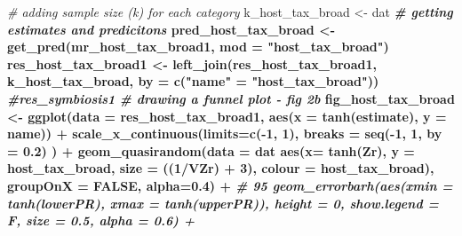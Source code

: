 \documentclass[
]{article}
\newenvironment{Shaded}{\begin{snugshade}}{\end{snugshade}}
\newcommand{\CommentTok}[1]{\textcolor[rgb]{0.56,0.35,0.01}{\textit{#1}}}
\newcommand{\DataTypeTok}[1]{\textcolor[rgb]{0.13,0.29,0.53}{#1}}
\newcommand{\DecValTok}[1]{\textcolor[rgb]{0.00,0.00,0.81}{#1}}
\newcommand{\FloatTok}[1]{\textcolor[rgb]{0.00,0.00,0.81}{#1}}
\newcommand{\KeywordTok}[1]{\textcolor[rgb]{0.13,0.29,0.53}{\textbf{#1}}}
\newcommand{\NormalTok}[1]{#1}
\newcommand{\OperatorTok}[1]{\textcolor[rgb]{0.81,0.36,0.00}{\textbf{#1}}}
\newcommand{\OtherTok}[1]{\textcolor[rgb]{0.56,0.35,0.01}{#1}}
\newcommand{\StringTok}[1]{\textcolor[rgb]{0.31,0.60,0.02}{#1}}
\begin{document}
\begin{Shaded}
\begin{Highlighting}[]
\CommentTok{# adding sample size (k) for each category}
\NormalTok{k_host_tax_broad <-}\StringTok{ }\NormalTok{dat }\OperatorTok{%
\CommentTok{# getting estimates and predicitons}
\NormalTok{pred_host_tax_broad <-}\StringTok{ }\KeywordTok{get_pred}\NormalTok{(mr_host_tax_broad1, }\DataTypeTok{mod =} \StringTok{"host_tax_broad"}\NormalTok{) }
\NormalTok{res_host_tax_broad1 <-}\StringTok{ }\KeywordTok{left_join}\NormalTok{(res_host_tax_broad1, k_host_tax_broad, }\DataTypeTok{by =}  \KeywordTok{c}\NormalTok{(}\StringTok{"name"}\NormalTok{ =}\StringTok{ "host_tax_broad"}\NormalTok{))  }\OperatorTok{%
\CommentTok{#res_symbiosis1 }
\CommentTok{# drawing a funnel plot - fig 2b}
\NormalTok{fig_host_tax_broad <-}\StringTok{ }\KeywordTok{ggplot}\NormalTok{(}\DataTypeTok{data =}\NormalTok{ res_host_tax_broad1, }\KeywordTok{aes}\NormalTok{(}\DataTypeTok{x =} \KeywordTok{tanh}\NormalTok{(estimate), }\DataTypeTok{y =}\NormalTok{ name)) }\OperatorTok{+}
\StringTok{  }\KeywordTok{scale_x_continuous}\NormalTok{(}\DataTypeTok{limits=}\KeywordTok{c}\NormalTok{(}\OperatorTok{-}\DecValTok{1}\NormalTok{, }\DecValTok{1}\NormalTok{), }\DataTypeTok{breaks =} \KeywordTok{seq}\NormalTok{(}\OperatorTok{-}\DecValTok{1}\NormalTok{, }\DecValTok{1}\NormalTok{, }\DataTypeTok{by =} \FloatTok{0.2}\NormalTok{) ) }\OperatorTok{+}
\StringTok{  }\KeywordTok{geom_quasirandom}\NormalTok{(}\DataTypeTok{data =}\NormalTok{ dat }\OperatorTok{%
                   \KeywordTok{aes}\NormalTok{(}\DataTypeTok{x=} \KeywordTok{tanh}\NormalTok{(Zr), }\DataTypeTok{y =}\NormalTok{ host_tax_broad, }\DataTypeTok{size =}\NormalTok{ ((}\DecValTok{1}\OperatorTok{/}\NormalTok{VZr) }\OperatorTok{+}\StringTok{ }\DecValTok{3}\NormalTok{), }\DataTypeTok{colour =}\NormalTok{ host_tax_broad), }\DataTypeTok{groupOnX =} \OtherTok{FALSE}\NormalTok{, }\DataTypeTok{alpha=}\FloatTok{0.4}\NormalTok{) }\OperatorTok{+}\StringTok{ }
\StringTok{  }\CommentTok{# 95 %
\StringTok{  }\KeywordTok{geom_errorbarh}\NormalTok{(}\KeywordTok{aes}\NormalTok{(}\DataTypeTok{xmin =} \KeywordTok{tanh}\NormalTok{(lowerPR), }\DataTypeTok{xmax =} \KeywordTok{tanh}\NormalTok{(upperPR)),  }\DataTypeTok{height =} \DecValTok{0}\NormalTok{, }\DataTypeTok{show.legend =}\NormalTok{ F, }\DataTypeTok{size =} \FloatTok{0.5}\NormalTok{, }\DataTypeTok{alpha =} \FloatTok{0.6}\NormalTok{) }\OperatorTok{+}
}}}}
\end{Highlighting}
\end{Shaded}
\end{document}
